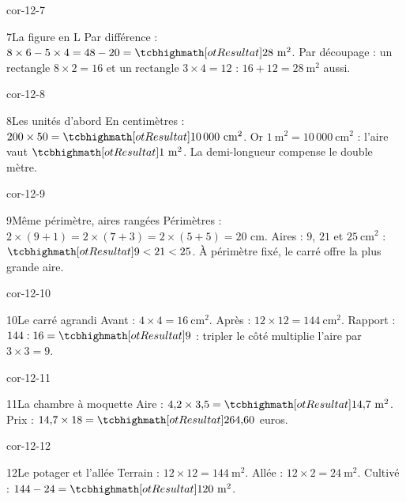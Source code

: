 \begin{blocLivre}{cor-12-7}\begin{corrige}{7}{La figure en L}
Par différence : $8\times6-5\times4=48-20=\res{28\ \mathrm m^2}$. Par découpage : un rectangle $8\times2=16$ et un rectangle $3\times4=12$ : $16+12=28\ \mathrm m^2$ aussi.
\label{fig-cor-12-7}
\end{corrige}\end{blocLivre}
\begin{blocLivre}{cor-12-8}\begin{corrige}{8}{Les unités d’abord}
En centimètres : $200\times50=\res{10\,000\ \mathrm{cm}^2}$. Or $1\ \mathrm m^2=10\,000\ \mathrm{cm}^2$ : l’aire vaut $\res{1\ \mathrm m^2}$. La demi-longueur compense le double mètre.
\end{corrige}\end{blocLivre}
\begin{blocLivre}{cor-12-9}\begin{corrige}{9}{Même périmètre, aires rangées}
Périmètres : $2\times(9+1)=2\times(7+3)=2\times(5+5)=20$ cm. Aires : $9$, $21$ et $25\ \mathrm{cm}^2$ : $\res{9<21<25}$. À périmètre fixé, le carré offre la plus grande aire.
\end{corrige}\end{blocLivre}
\begin{blocLivre}{cor-12-10}\begin{corrige}{10}{Le carré agrandi}
Avant : $4\times4=16\ \mathrm{cm}^2$. Après : $12\times12=144\ \mathrm{cm}^2$. Rapport : $144:16=\res9$ : tripler le côté multiplie l’aire par $3\times3=9$.
\end{corrige}\end{blocLivre}
\begin{blocLivre}{cor-12-11}\begin{corrige}{11}{La chambre à moquette}
Aire : $4{,}2\times3{,}5=\res{14{,}7\ \mathrm m^2}$. Prix : $14{,}7\times18=\res{264{,}60}$ euros.
\end{corrige}\end{blocLivre}
\begin{blocLivre}{cor-12-12}\begin{corrige}{12}{Le potager et l’allée}
Terrain : $12\times12=144\ \mathrm m^2$. Allée : $12\times2=24\ \mathrm m^2$. Cultivé : $144-24=\res{120\ \mathrm m^2}$.
\end{corrige}\end{blocLivre}
